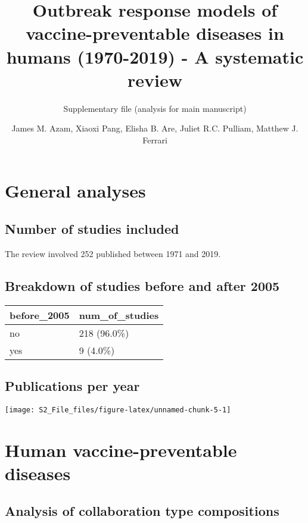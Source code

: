 \documentclass[
]{article}
\title{Outbreak response models of vaccine-preventable diseases in
humans (1970-2019) - A systematic review}
\subtitle{Supplementary file (analysis for main manuscript)}
\author{James M. Azam, Xiaoxi Pang, Elisha B. Are, Juliet R.C. Pulliam,
Matthew J. Ferrari}
\date{}
\begin{document}
\maketitle

{
\setcounter{tocdepth}{2}
\tableofcontents
}
\hypertarget{general-analyses}{%
\section{General analyses}\label{general-analyses}}

\hypertarget{number-of-studies-included}{%
\subsection{Number of studies
included}\label{number-of-studies-included}}

The review involved 252 published between 1971 and 2019.

\hypertarget{breakdown-of-studies-before-and-after-2005}{%
\subsection{Breakdown of studies before and after
2005}\label{breakdown-of-studies-before-and-after-2005}}

\begin{tabular}{ll}
\toprule
before\_2005 & num\_of\_studies \\
\midrule
no & 218 (96.0\%) \\
yes & 9 (4.0\%) 
\end{tabular}

\hypertarget{publications-per-year}{%
\subsection{Publications per year}\label{publications-per-year}}

\texttt{[image: S2\_File\_files/figure-latex/unnamed-chunk-5-1]}

\hypertarget{human-vaccine-preventable-diseases}{%
\section{Human vaccine-preventable
diseases}\label{human-vaccine-preventable-diseases}}

\hypertarget{analysis-of-collaboration-type-compositions}{%
\subsection{Analysis of collaboration type
compositions}\label{analysis-of-collaboration-type-compositions}}
\end{document}

